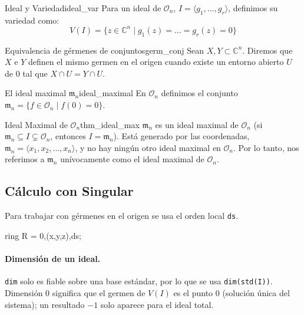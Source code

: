 \documentclass[11pt,a4paper]{article}
\begin{document}
\begin{definicion}{Ideal y Variedad}{ideal_var}
Para un ideal de $\mathcal{O}_n$, $I = \langle g_1, \dots, g_r \rangle$, definimos su variedad como:
$$ V(I) = \{ z \in \mathbb{C}^n \mid g_1(z) = \dots = g_r(z) = 0 \} $$
\end{definicion}

\begin{definicion}{Equivalencia de gérmenes de conjuntos}{germ_conj}
Sean $X, Y \subset \mathbb{C}^n$. Diremos que $X$ e $Y$ definen el mismo germen en el origen cuando existe un entorno abierto $U$ de $0$ tal que $X \cap U = Y \cap U$.
\end{definicion}

\begin{nota}{El ideal maximal $\mathfrak{m}_n$}{ideal_maximal}
En $\mathcal{O}_n$ definimos el conjunto $\mathfrak{m}_n = \{ f \in \mathcal{O}_n \mid f(0) = 0 \}$.
\end{nota}

\begin{teorema}{Ideal Maximal de $\mathcal{O}_n$}{thm_ideal_max}
$\mathfrak{m}_n$ es un ideal maximal de $\mathcal{O}_n$ (si $\mathfrak{m}_n \subseteq I \subsetneq \mathcal{O}_n$, entonces $I = \mathfrak{m}_n$). Está generado por las coordenadas, $\mathfrak{m}_n = \langle x_1, x_2, \dots, x_n \rangle$, y no hay ningún otro ideal maximal en $\mathcal{O}_n$. Por lo tanto, nos referimos a $\mathfrak{m}_n$ unívocamente como el ideal maximal de $\mathcal{O}_n$.
\end{teorema}

\subsection*{Cálculo con Singular}

Para trabajar con gérmenes en el origen se usa el orden local \texttt{ds}.

\begin{singular}
ring R = 0,(x,y,z),ds;
\end{singular}

\paragraph{Dimensión de un ideal.} \texttt{dim} solo es fiable sobre una base estándar, por lo que se usa \texttt{dim(std(I))}. Dimensión $0$ significa que el germen de $V(I)$ es el punto $0$ (solución única del sistema); un resultado $-1$ solo aparece para el ideal total.
\end{document}
